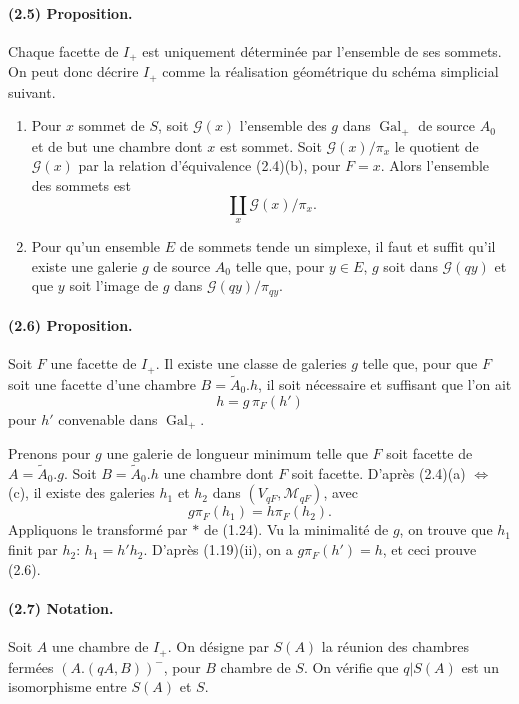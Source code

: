 \documentclass[10pt,a4paper]{article}
\begin{document}
\paragraph{(2.5) Proposition.} Chaque facette de \(I_+\) est uniquement déterminée par l'ensemble de ses sommets. On peut donc décrire \(I_+\) comme la réalisation géométrique du schéma simplicial suivant.
\begin{enumerate}[label=\alph*)]
\item Pour \(x\) sommet de \(S\), soit \(\mathcal G(x)\) l'ensemble des \(g\) dans \(\operatorname{Gal}_+\) de source \(A_0\) et de but une chambre dont \(x\) est sommet. Soit \(\mathcal G(x)/\pi_x\) le quotient de \(\mathcal G(x)\) par la relation d'équivalence (2.4)(b), pour \(F=x\). Alors l'ensemble des sommets est
\[
\coprod_x \mathcal G(x)/\pi_x.
\]
\item Pour qu'un ensemble \(E\) de sommets tende un simplexe, il faut et suffit qu'il existe une galerie \(g\) de source \(A_0\) telle que, pour \(y\in E\), \(g\) soit dans \(\mathcal G(qy)\) et que \(y\) soit l'image de \(g\) dans \(\mathcal G(qy)/\pi_{qy}\).
\end{enumerate}

\paragraph{(2.6) Proposition.} Soit \(F\) une facette de \(I_+\). Il existe une classe de galeries \(g\) telle que, pour que \(F\) soit une facette d'une chambre \(B=\widetilde A_0.h\), il soit nécessaire et suffisant que l'on ait
\[
h=g\,\pi_F(h')
\]
pour \(h'\) convenable dans \(\operatorname{Gal}_+\).

Prenons pour \(g\) une galerie de longueur minimum telle que \(F\) soit facette de \(A=\widetilde A_0.g\). Soit \(B=\widetilde A_0.h\) une chambre dont \(F\) soit facette. D'après (2.4)(a) \(\Leftrightarrow\) (c), il existe des galeries \(h_1\) et \(h_2\) dans \((V_{qF},\mathcal M_{qF})\), avec
\[
g\pi_F(h_1)=h\pi_F(h_2).
\]
Appliquons le transformé par \(*\) de (1.24). Vu la minimalité de \(g\), on trouve que \(h_1\) finit par \(h_2\): \(h_1=h'h_2\). D'après (1.19)(ii), on a \(g\pi_F(h')=h\), et ceci prouve (2.6).

\paragraph{(2.7) Notation.} Soit \(A\) une chambre de \(I_+\). On désigne par \(S(A)\) la réunion des chambres fermées \((A.(qA,B))^{-}\), pour \(B\) chambre de \(S\). On vérifie que \(q|S(A)\) est un isomorphisme entre \(S(A)\) et \(S\).
\end{document}

